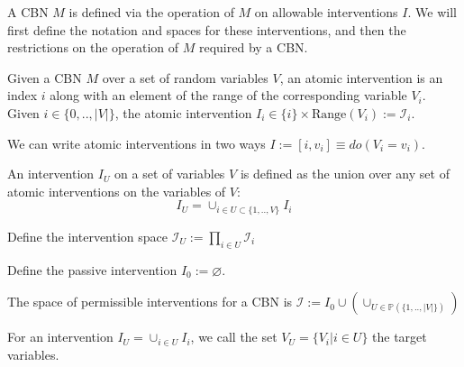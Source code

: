 A CBN $M$ is defined via the operation of $M$ on allowable interventions $I$. We will first define the notation and spaces for these interventions, and then the restrictions on the operation of $M$ required by a CBN.

\begin{definition}
Given a CBN $M$ over a set of random variables $V$, an atomic intervention is an index $i$ along with an element of the range of the corresponding variable $V_i$. Given $i\in\{0,..,|V|\}$, the atomic intervention $I_i \in \{i\}\times \text{Range}(V_i):=\mathcal{I}_{i}$. 

We can write atomic interventions in two ways $I:=[i,v_i]\equiv do(V_i=v_i)$.

\end{definition}

\begin{definition}
An intervention $I_U$ on a set of variables $V$ is defined as the union over any set of atomic interventions on the variables of $V$: 
\[I_U=\cup_{i\in U\subset \{1,..,V\}} I_{i}\]

Define the intervention space $\mathcal{I}_U:=\prod_{i\in U} \mathcal{I}_i$
\end{definition}

\begin{definition}
Define the passive intervention $I_0:=\varnothing$.
\end{definition}

\begin{definition}\label{def:cbn_intervention_space}
The space of permissible interventions for a CBN is $\mathcal{I} := I_0\cup \left(\cup_{U\in\mathds{P}(\{1,..,|V|\})}\right)$
\end{definition}

\begin{definition}
For an intervention $I_U = \cup_{i\in U} I_{i}$, we call the set $V_U = \{V_i|i\in U\}$ the target variables.
\end{definition}

